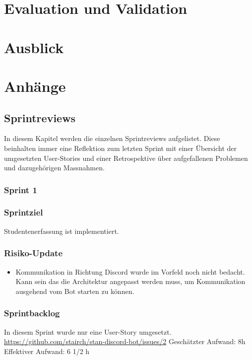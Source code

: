 \documentclass[a4paper, table]{article}
\begin{document}
\newpage
\section{Evaluation und Validation}


\newpage
\section{Ausblick}


\newpage

\section{Anh\"ange}

\subsection{Sprintreviews}\label{Sprintreviews}
In diesem Kapitel werden die einzelnen Sprintreviews aufgelistet.
Diese beinhalten immer eine Reflektion zum letzten Sprint mit einer Übersicht der umgesetzten User-Stories und
einer Retrospektive über aufgefallenen Problemen und dazugehörigen Massnahmen.

\subsubsection{Sprint 1}
\subsubsection*{Sprintziel}
Studentenerfassung ist implementiert.

\subsubsection*{Risiko-Update}
\begin{itemize}
    \item Kommunikation in Richtung Discord wurde im Vorfeld noch nicht bedacht.
    Kann sein das die Architektur angepasst werden muss, um Kommunikation ausgehend vom Bot starten zu können.
\end{itemize}

\subsubsection*{Sprintbacklog}
In diesem Sprint wurde nur eine User-Story umgesetzt.\\
\url{https://github.com/stairch/stan-discord-bot/issues/2}
\newline
Geschätzter Aufwand: 8h
\newline
Effektiver Aufwand: 6 1/2 h
\end{document}
